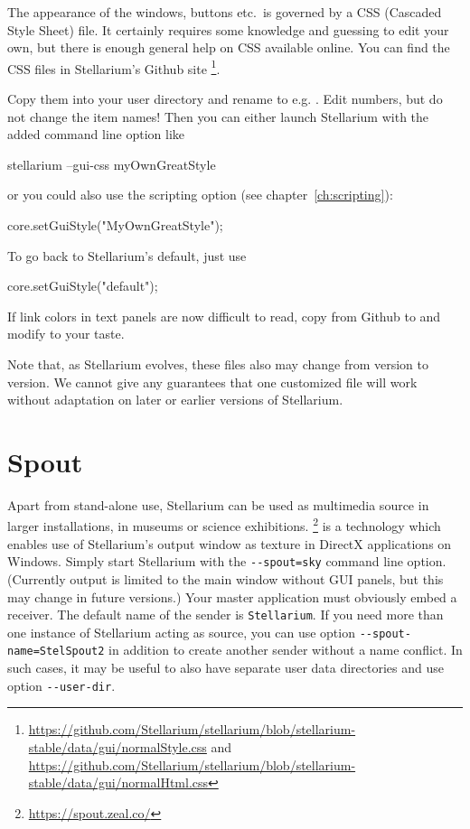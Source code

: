 The appearance of the windows, buttons etc.\ is governed by a CSS
(Cascaded Style Sheet) file. It certainly requires some knowledge and
guessing to edit your own, but there is enough general help on CSS available
online. You can find the CSS files in Stellarium's Github site%
\footnote{\url{https://github.com/Stellarium/stellarium/blob/stellarium-stable/data/gui/normalStyle.css} and
  \url{https://github.com/Stellarium/stellarium/blob/stellarium-stable/data/gui/normalHtml.css}}.


Copy them into your user directory
and rename to e.g. . Edit numbers, but do
not change the item names! Then you can either launch Stellarium with
the added command line option like
\begin{commands}
  stellarium --gui-css myOwnGreatStyle
\end{commands}
or you could also use the scripting option (see chapter~\ref{ch:scripting}):
\begin{script}
  core.setGuiStyle("MyOwnGreatStyle");
\end{script}
To go back to Stellarium's default, just use
\begin{script}
  core.setGuiStyle("default");
\end{script}

If link colors in text panels are now difficult to read, copy
 from Github to
 and modify to your taste.

Note that, as Stellarium evolves, these files also may change from
version to version. We cannot give any guarantees that one customized
file will work without adaptation on later or earlier versions of Stellarium.


\section{Spout} 
\label{sec:CommandLineOptions:Special:Spout}
Apart from stand-alone use, Stellarium can be used as multimedia source in larger installations, in museums or science exhibitions. 
\footnote{\url{https://spout.zeal.co/}} is a technology which enables use of Stellarium's 
output window as texture in DirectX applications on Windows. Simply start Stellarium with 
the \texttt{-\/-spout=sky} command line option. (Currently  output is limited to the main window 
without GUI panels, but this may change in future versions.) 
Your master application must obviously embed a  receiver. 
The default name of the  sender is \texttt{Stellarium}. If you need more than one instance of Stellarium acting as source, 
you can use option \texttt{-\/-spout-name=StelSpout2} in addition to create another  sender without a name conflict. 
In such cases, it may be useful to also have separate user data directories and use option \texttt{-\/-user-dir}. 

